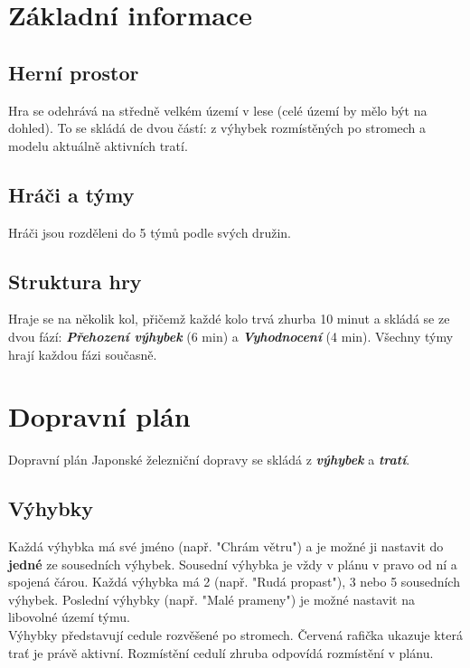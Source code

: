 \documentclass[11pt,a4paper,twocolumn, bold]{report}
\title{}
\date{}
\begin{document}
\BgThispage
\maketitle
\frenchspacing

\section{Základní informace}
\subsection{Herní prostor}

Hra se odehrává na středně velkém území v lese (celé území by mělo být na dohled). To se skládá de dvou částí: z výhybek rozmístěných po stromech a modelu aktuálně aktivních tratí.

\subsection{Hráči a týmy}

Hráči jsou rozděleni do 5 týmů podle svých družin.

\subsection{Struktura hry}

Hraje se na několik kol, přičemž každé kolo trvá zhurba 10 minut a skládá se ze dvou fází: \textit{\textbf{Přehození výhybek}} (6 min) a \textit{\textbf{Vyhodnocení}} (4 min). Všechny týmy hrají každou fázi současně.

\section{Dopravní plán}
\noindent Dopravní plán Japonské železniční dopravy se skládá z \textit{\textbf{výhybek}} a \textit{\textbf{tratí}}.

\subsection{Výhybky}
Každá výhybka má své jméno (např. "Chrám větru") a je možné ji nastavit do \textbf{jedné} ze sousedních výhybek. Sousední výhybka je vždy v plánu v pravo od ní a spojená čárou. Každá výhybka má 2 (např. "Rudá propast"), 3 nebo 5 sousedních výhybek. Poslední výhybky (např. "Malé prameny") je možné nastavit na libovolné území týmu. \\ Výhybky představují cedule rozvěšené po stromech. Červená rafička ukazuje která trať je právě aktivní. Rozmístění cedulí zhruba odpovídá rozmístění v plánu.
\end{document}
